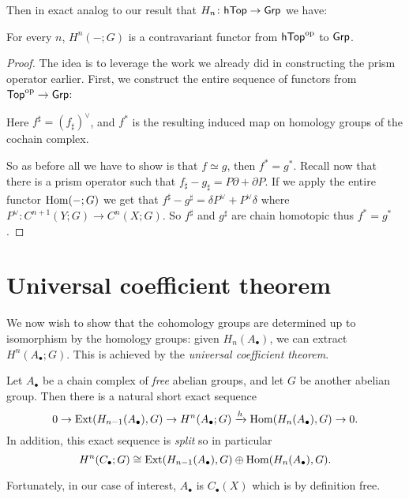 Then in exact analog to our result that $H_n \colon \mathsf{hTop} \to \mathsf{Grp}$ we have:
\begin{theorem}
	For every $n$, $H^n(-;G)$ is a contravariant functor
	from $\mathsf{hTop}^{\mathrm{op}}$ to $\mathsf{Grp}$.
\end{theorem}
\begin{proof}
	The idea is to leverage the work we already did in constructing
	the prism operator earlier.
	First, we construct the entire sequence of functors
	from $\mathsf{Top}^{\mathrm{op}} \to \mathsf{Grp}$:
	\begin{center}
	\end{center}
	Here $f^\sharp = (f_\sharp)^\vee$, and $f^\ast$
	is the resulting induced map on homology groups of the cochain complex.

	So as before all we have to show is that $f \simeq g$,
	then $f^\ast = g^\ast$.
	Recall now that there is a prism operator such that
	$f_\sharp - g_\sharp = P \partial + \partial P$.
	If we apply the entire functor $\operatorname{Hom}(-;G)$ we get that
	$f^\sharp - g^\sharp = \delta P^\vee + P^\vee \delta$
	where $P^\vee \colon C^{n+1}(Y;G) \to C^n(X;G)$.
	So $f^\sharp$ and $g^\sharp$ are chain homotopic thus $f^\ast = g^\ast$.
\end{proof}


\section{Universal coefficient theorem}
We now wish to show that the cohomology groups are determined up to isomorphism
by the homology groups: given $H_n(A_\bullet)$, we can extract $H^n(A_\bullet; G)$.
This is achieved by the \emph{universal coefficient theorem}.
\begin{theorem}
	Let $A_\bullet$ be a chain complex of \emph{free} abelian groups,
	and let $G$ be another abelian group.
	Then there is a natural short exact sequence
	\[
		0 \to \operatorname{Ext}(H_{n-1}(A_\bullet), G) \to H^n(A_\bullet; G)
		\xrightarrow{h} \operatorname{Hom}(H_n(A_\bullet), G) \to 0. \]
	In addition, this exact sequence is \emph{split}
	so in particular
	\[ H^n(C_\bullet; G) \cong \operatorname{Ext}(H_{n-1}(A_\bullet), G)
		\oplus \operatorname{Hom}(H_n(A_\bullet), G). \]
\end{theorem}
Fortunately, in our case of interest, $A_\bullet$ is $C_\bullet(X)$
which is by definition free.

